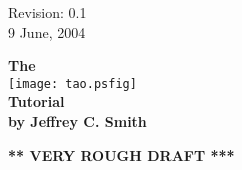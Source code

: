 \documentclass{report}
\begin{document}

\thispagestyle{empty}

\begin{flushright}
\large
  Revision: 0.1 \\
  9 June, 2004 \\
\end{flushright}

\vfill

{
\begin{center}
{\Huge \sf\bf The} \\
\vskip 0.1in
\texttt{[image: tao.psfig]} \\
\vskip 0.1in
{\Huge \sf\bf Tutorial} \\
\vskip 0.1in
{\normalsize \sf\bf by Jeffrey C. Smith} \\
\end{center}
}

\vskip 1in
\begin{center}
{\Huge \bf *** VERY ROUGH DRAFT ***}
\end{center}
\vfill
\break
\end{document}
